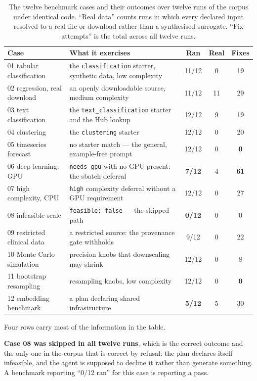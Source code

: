 \begin{table}[htbp]
\centering\small
\caption{The twelve benchmark cases and their outcomes over twelve runs of the
corpus under identical code. ``Real data'' counts runs in which every declared
input resolved to a real file or download rather than a synthesised surrogate.
``Fix attempts'' is the total across all twelve runs.}
\label{tab:benchmark-cases}
\begin{tabularx}{\textwidth}{lXccc}
\toprule
\textbf{Case} & \textbf{What it exercises} & \textbf{Ran} & \textbf{Real} & \textbf{Fixes} \\
\midrule
01 tabular classification & the \texttt{classification} starter, synthetic data, low complexity & 11/12 & 0 & 19 \\
02 regression, real download & an openly downloadable source, medium complexity & 11/12 & 11 & 29 \\
03 text classification & the \texttt{text\_classification} starter and the Hub lookup & 12/12 & 9 & 19 \\
04 clustering & the \texttt{clustering} starter & 12/12 & 0 & 20 \\
05 timeseries forecast & no starter match --- the general, example-free prompt & 12/12 & 0 & \textbf{0} \\
06 deep learning, GPU & \texttt{needs\_gpu} with no GPU present: the sbatch deferral & \textbf{7/12} & 4 & \textbf{61} \\
07 high complexity, CPU & \texttt{high} complexity deferral without a GPU requirement & 12/12 & 0 & 27 \\
08 infeasible scale & \texttt{feasible: false} --- the skipped path & \textbf{0/12} & 0 & 0 \\
09 restricted clinical data & a restricted source: the provenance gate withholds & 9/12 & 0 & 22 \\
10 Monte Carlo simulation & precision knobs that downscaling may shrink & 12/12 & 0 & 8 \\
11 bootstrap resampling & resampling knobs, low complexity & 12/12 & 0 & \textbf{0} \\
12 embedding benchmark & a plan declaring shared infrastructure & \textbf{5/12} & 5 & 30 \\
\bottomrule
\end{tabularx}
\end{table}

Four rows carry most of the information in the table.

\textbf{Case 08 was skipped in all twelve runs}, which is the correct outcome
and the only one in the corpus that is correct by refusal: the plan declares
itself infeasible, and the agent is supposed to decline it rather than generate
something. A benchmark reporting ``0/12 ran'' for this case is reporting a pass.

